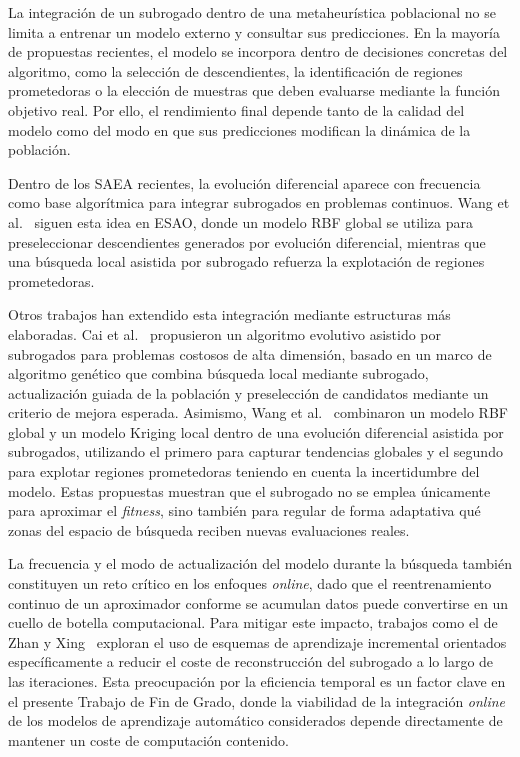 La integración de un subrogado dentro de una metaheurística poblacional no se
limita a entrenar un modelo externo y consultar sus predicciones. En la mayoría
de propuestas recientes, el modelo se incorpora dentro de decisiones concretas
del algoritmo, como la selección de descendientes, la identificación de regiones
prometedoras o la elección de muestras que deben evaluarse mediante la función
objetivo real. Por ello, el rendimiento final depende tanto de la calidad del
modelo como del modo en que sus predicciones modifican la dinámica de la
población.

Dentro de los SAEA recientes, la evolución diferencial aparece con frecuencia
como base algorítmica para integrar subrogados en problemas continuos. Wang et
al.~\cite{wang2019evolutionarySampling} siguen esta idea en ESAO, donde un
modelo RBF global se utiliza para preseleccionar descendientes generados por
evolución diferencial, mientras que una búsqueda local asistida por subrogado
refuerza la explotación de regiones prometedoras.

Otros trabajos han extendido esta integración mediante estructuras más
elaboradas. Cai et al.~\cite{cai2020generalizedSAEA} propusieron un algoritmo evolutivo asistido por subrogados para problemas costosos de alta dimensión, basado en un marco de algoritmo genético que combina búsqueda local mediante subrogado, actualización guiada de la población y preselección de candidatos mediante un criterio de mejora esperada. Asimismo, Wang et al.~\cite{wang2023glsade} combinaron un modelo RBF global y un modelo Kriging local dentro de una evolución diferencial asistida por subrogados, utilizando el primero para capturar tendencias globales y el segundo para explotar regiones prometedoras teniendo en cuenta la incertidumbre del modelo. Estas propuestas muestran que el subrogado no se emplea únicamente para aproximar el \textit{fitness}, sino también para regular de forma adaptativa qué zonas del espacio de búsqueda reciben nuevas evaluaciones reales.

La frecuencia y el modo de actualización del modelo durante la búsqueda también constituyen un reto crítico en los enfoques \textit{online}, dado que el reentrenamiento continuo de un aproximador conforme se acumulan datos puede convertirse en un cuello de botella computacional. Para mitigar este impacto, trabajos como el de Zhan y Xing~\cite{zhan2021fastKriging} exploran el uso de esquemas de aprendizaje incremental orientados específicamente a reducir el coste de reconstrucción del subrogado a lo largo de las iteraciones. Esta preocupación por la eficiencia temporal es un factor clave en el presente Trabajo de Fin de Grado, donde la viabilidad de la integración \textit{online} de los modelos de aprendizaje automático considerados depende directamente de mantener un coste de computación contenido.

